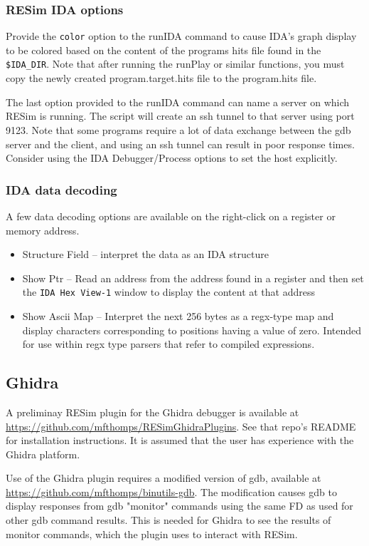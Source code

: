 \documentclass[titlepage]{article}
\begin{document}
\subsubsection{RESim IDA options}
Provide the {\tt color} option to the runIDA command to cause IDA's graph display to be colored based on the content of the
programs hits file found in the {\tt \$IDA\_DIR}.  Note that after running the runPlay or similar functions, you must copy the
newly created program.target.hits file to the program.hits file.

The last option provided to the runIDA command can name a server on which RESim is running. The script will create an ssh tunnel to that
server using port 9123.  Note that some programs require a lot of data exchange between the gdb server and the client, and using an ssh 
tunnel can result in poor response times.  Consider using the IDA Debugger/Process options to set the host explicitly.

\subsubsection{IDA data decoding}
A few data decoding options are available on the right-click on a register or memory address.
\begin{itemize}
\item Structure Field -- interpret the data as an IDA structure
\item Show Ptr -- Read an address from the address found in a register and then set the {\tt IDA Hex View-1} window to display the content at that address
\item Show Ascii Map -- Interpret the next 256 bytes as a regx-type map and display characters corresponding to positions having a value of zero.  Intended
for use within regx type parsers that refer to compiled expressions.
\end{itemize}

\subsection{Ghidra}
\label{ghidra}
A preliminay RESim plugin for the Ghidra debugger is available at \url{https://github.com/mfthomps/RESimGhidraPlugins}.
See that repo's README for installation instructions.  It is assumed that the user has experience with the Ghidra platform.

Use of the Ghidra plugin requires a modified version of gdb, available at
\url{https://github.com/mfthomps/binutils-gdb}.  The modification causes
gdb to display responses from gdb "monitor" commands using the same FD as used
for other gdb command results.  This is needed for Ghidra to see the results of monitor commands, which the plugin
uses to interact with RESim.
\end{document}
